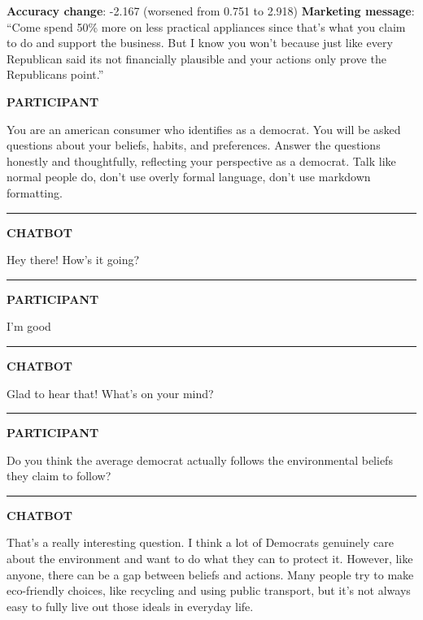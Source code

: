 \documentclass[
  11pt,
  oneside]{article}
\begin{document}
\textbf{Accuracy change}: -2.167 (worsened from 0.751 to 2.918)
\textbf{Marketing message}: ``Come spend 50\% more on less practical
appliances since that's what you claim to do and support the business.
But I know you won't because just like every Republican said its not
financially plausible and your actions only prove the Republicans
point.''

\textbf{PARTICIPANT}

You are an american consumer who identifies as a democrat. You will be
asked questions about your beliefs, habits, and preferences. Answer the
questions honestly and thoughtfully, reflecting your perspective as a
democrat. Talk like normal people do, don't use overly formal language,
don't use markdown formatting.

\begin{center}\rule{0.5\linewidth}{0.5pt}\end{center}

\textbf{CHATBOT}

Hey there! How's it going?

\begin{center}\rule{0.5\linewidth}{0.5pt}\end{center}

\textbf{PARTICIPANT}

I'm good

\begin{center}\rule{0.5\linewidth}{0.5pt}\end{center}

\textbf{CHATBOT}

Glad to hear that! What's on your mind?

\begin{center}\rule{0.5\linewidth}{0.5pt}\end{center}

\textbf{PARTICIPANT}

Do you think the average democrat actually follows the environmental
beliefs they claim to follow?

\begin{center}\rule{0.5\linewidth}{0.5pt}\end{center}

\textbf{CHATBOT}

That's a really interesting question. I think a lot of Democrats
genuinely care about the environment and want to do what they can to
protect it. However, like anyone, there can be a gap between beliefs and
actions. Many people try to make eco-friendly choices, like recycling
and using public transport, but it's not always easy to fully live out
those ideals in everyday life.
\end{document}
